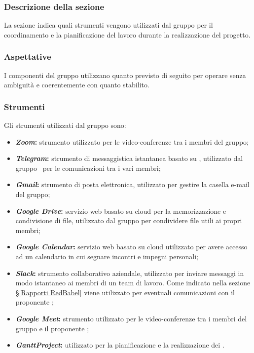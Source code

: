 \subsubsection{Descrizione della sezione}
La sezione indica quali strumenti vengono utilizzati dal gruppo per il coordinamento e la pianificazione del lavoro durante la realizzazione del progetto.
\subsubsection{Aspettative}
I componenti del gruppo utilizzano quanto previsto di seguito per operare senza ambiguità e coerentemente con quanto stabilito.
\subsubsection{Strumenti}
Gli strumenti utilizzati dal gruppo sono:
\begin{itemize}
	\item \textbf{\textit{Zoom}:} strumento utilizzato per le video-conferenze tra i membri del gruppo;
	\item \textbf{\textit{Telegram}:} strumento di messaggistica istantanea basato su , utilizzato dal gruppo \Gruppo\ per le comunicazioni tra i vari membri;
	\item \textbf{\textit{Gmail}:} strumento  di posta elettronica, utilizzato per gestire la casella e-mail del gruppo;
	\item \textbf{\textit{Google Drive}:} servizio web basato su cloud per la memorizzazione e condivisione di file, utilizzato dal gruppo per condividere file utili ai propri membri;
	\item \textbf{\textit{Google Calendar}:} servizio web basato su cloud utilizzato per avere accesso ad un calendario in cui segnare incontri e impegni personali;
	\item \textbf{\textit{Slack}:} strumento collaborativo aziendale, utilizzato per inviare messaggi in modo istantaneo ai membri di un team di lavoro. Come indicato nella sezione \S\ref{Rapporti RedBabel} viene utilizzato per eventuali comunicazioni con il proponente \Proponente;
	\item \textbf{\textit{Google Meet}:} strumento utilizzato per le video-conferenze tra i membri del gruppo e il proponente \Proponente;
	\item \textbf{\textit{GanttProject}:} utilizzato per la pianificazione e la realizzazione dei .
\end{itemize}

